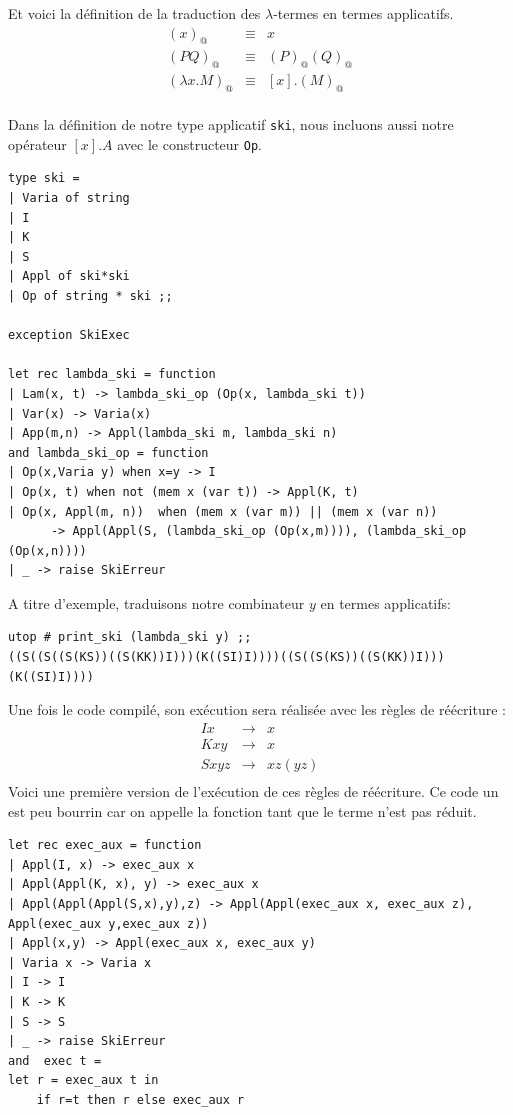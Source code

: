 Et voici la définition de la traduction des $\lambda$-termes en termes applicatifs.
\[
\begin{array}{lcl}
	 (x)_@  &\equiv & x \\
	(PQ)_@  &\equiv & (P)_@ (Q)_@ \\
	(\lambda x.M)_@  &\equiv & [x] .(M)_@   \\
\end{array}
\]

Dans la définition de notre type applicatif \verb+ski+, nous incluons aussi notre opérateur $[x].A$ 
avec le constructeur \verb+Op+.

\begin{verbatim}
type ski = 
| Varia of string
| I
| K
| S
| Appl of ski*ski 
| Op of string * ski ;;

exception SkiExec

let rec lambda_ski = function
| Lam(x, t) -> lambda_ski_op (Op(x, lambda_ski t))
| Var(x) -> Varia(x)
| App(m,n) -> Appl(lambda_ski m, lambda_ski n) 
and lambda_ski_op = function
| Op(x,Varia y) when x=y -> I 
| Op(x, t) when not (mem x (var t)) -> Appl(K, t) 
| Op(x, Appl(m, n))  when (mem x (var m)) || (mem x (var n)) 
	  -> Appl(Appl(S, (lambda_ski_op (Op(x,m)))), (lambda_ski_op (Op(x,n)))) 
| _ -> raise SkiErreur
\end{verbatim}
A titre d'exemple, traduisons notre combinateur $y$ en termes applicatifs:
\begin{verbatim}
utop # print_ski (lambda_ski y) ;;
((S((S((S(KS))((S(KK))I)))(K((SI)I))))((S((S(KS))((S(KK))I)))(K((SI)I))))
\end{verbatim}
Une fois le code compilé, son exécution sera réalisée avec les règles de réécriture :
\[
\begin{array}{ccc}
	Ix &\longrightarrow & x \\
	Kxy &\longrightarrow & x \\
	Sxyz &\longrightarrow & x z (y z)	\\
\end{array}	
\]
Voici une première version de l'exécution de ces règles de réécriture. Ce code un est peu bourrin car on appelle
la fonction tant que le terme n'est pas réduit.
\begin{verbatim}
let rec exec_aux = function
| Appl(I, x) -> exec_aux x
| Appl(Appl(K, x), y) -> exec_aux x
| Appl(Appl(Appl(S,x),y),z) -> Appl(Appl(exec_aux x, exec_aux z), Appl(exec_aux y,exec_aux z))
| Appl(x,y) -> Appl(exec_aux x, exec_aux y)
| Varia x -> Varia x
| I -> I
| K -> K
| S -> S
| _ -> raise SkiErreur 
and  exec t =
let r = exec_aux t in
	if r=t then r else exec_aux r 
\end{verbatim}

